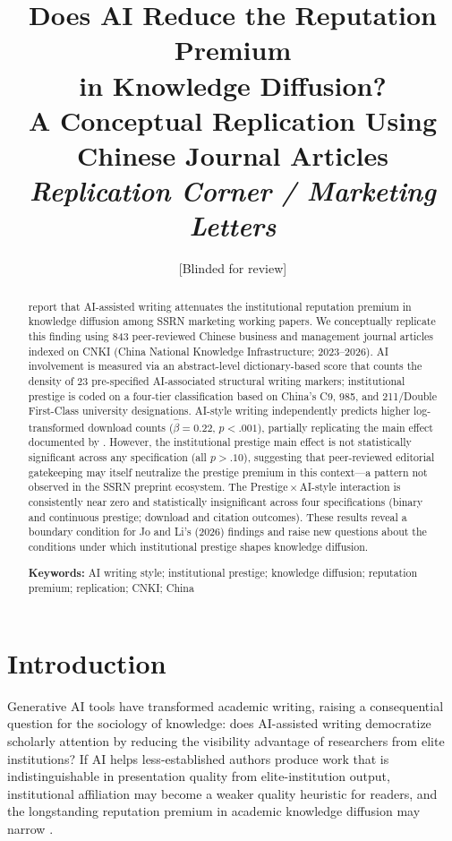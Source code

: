 \documentclass[12pt,a4paper]{article}
\title{\textbf{Does AI Reduce the Reputation Premium\\
in Knowledge Diffusion?\\
A Conceptual Replication Using Chinese Journal Articles}\\[0.8em]
\large\textit{Replication Corner / Marketing Letters}}
\author{[Blinded for review]}
\date{}
\begin{document}
\maketitle

\begin{abstract}
\noindent
\citet{JoLi2026} report that AI-assisted writing attenuates the
institutional reputation premium in knowledge diffusion among SSRN
marketing working papers.
We conceptually replicate this finding using 843 peer-reviewed Chinese
business and management journal articles indexed on CNKI
(China National Knowledge Infrastructure; 2023--2026).
AI involvement is measured via an abstract-level dictionary-based score
that counts the density of 23 pre-specified AI-associated structural
writing markers; institutional prestige is coded on a four-tier
classification based on China's C9, 985, and 211/Double First-Class
university designations.
AI-style writing independently predicts higher log-transformed download
counts ($\hat{\beta}=0.22$, $p<.001$), partially replicating the main
effect documented by \citet{JoLi2026}.
However, the institutional prestige main effect is not statistically
significant across any specification (all $p>.10$), suggesting that peer-reviewed
editorial gatekeeping may itself neutralize the prestige premium in this
context---a pattern not observed in the SSRN preprint ecosystem.
The Prestige\,$\times$\,AI-style interaction is consistently
near zero and statistically insignificant across four specifications
(binary and continuous prestige; download and citation outcomes).
These results reveal a boundary condition for Jo and Li's (2026) findings
and raise new questions about the conditions under which institutional
prestige shapes knowledge diffusion.

\smallskip\noindent
\textbf{Keywords:} AI writing style; institutional prestige; knowledge
diffusion; reputation premium; replication; CNKI; China
\end{abstract}

\newpage

\section{Introduction}
\label{sec:intro}

Generative AI tools have transformed academic writing, raising a
consequential question for the sociology of knowledge: does AI-assisted
writing democratize scholarly attention by reducing the visibility
advantage of researchers from elite institutions?
If AI helps less-established authors produce work that is
indistinguishable in presentation quality from elite-institution output,
institutional affiliation may become a weaker quality heuristic for
readers, and the longstanding reputation premium in academic knowledge
diffusion may narrow
\citep{Merton1968,Spence1973,DiMaggio1983}.
\end{document}
